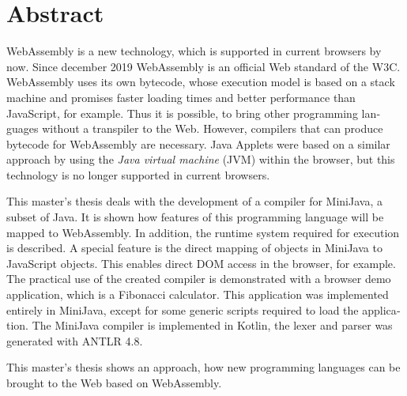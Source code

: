 \chapter{Abstract}


\begin{english}
WebAssembly is a new technology, which is supported in current browsers by now. Since december 2019 WebAssembly is an official Web standard of the W3C. WebAssembly uses its own bytecode, whose execution model is based on a stack machine and promises faster loading times and better performance than JavaScript, for example. Thus it is possible, to bring other programming languages without a transpiler to the Web. However, compilers that can produce bytecode for WebAssembly are necessary. Java Applets were based on a similar approach by using the \emph{Java virtual machine} (JVM) within the browser, but this technology is no longer supported in current browsers.

This master's thesis deals with the development of a compiler for MiniJava, a subset of Java. It is shown how features of this programming language will be mapped to Web\-Assembly. In addition, the runtime system required for execution is described. A special feature is the direct mapping of objects in MiniJava to JavaScript objects. This enables direct DOM access in the browser, for example. The practical use of the created compiler is demonstrated with a browser demo application, which is a Fibonacci calculator. This application was implemented entirely in MiniJava, except for some generic scripts required to load the application. The MiniJava compiler is implemented in Kotlin, the lexer and parser was generated with ANTLR 4.8.

This master's thesis shows an approach, how new programming languages can be brought to the Web based on WebAssembly.
\end{english}
